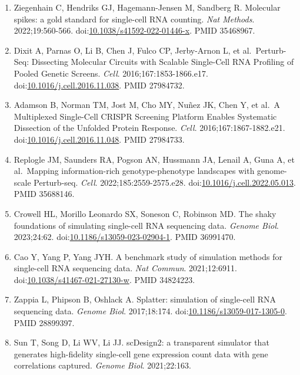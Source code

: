 \documentclass{article}
\begin{document}
\begin{enumerate}
  \emph{Nat Methods}. 2017;14:381-387.
  doi:\href{https://doi.org/10.1038/nmeth.4220}{10.1038/nmeth.4220}.
  PMID 28263961.
\item
  Ziegenhain C, Hendriks GJ, Hagemann-Jensen M, Sandberg R. Molecular
  spikes: a gold standard for single-cell RNA counting. \emph{Nat
  Methods}. 2022;19:560-566.
  doi:\href{https://doi.org/10.1038/s41592-022-01446-x}{10.1038/s41592-022-01446-x}.
  PMID 35468967.
\item
  Dixit A, Parnas O, Li B, Chen J, Fulco CP, Jerby-Arnon L, et
  al.~Perturb-Seq: Dissecting Molecular Circuits with Scalable
  Single-Cell RNA Profiling of Pooled Genetic Screens. \emph{Cell}.
  2016;167:1853-1866.e17.
  doi:\href{https://doi.org/10.1016/j.cell.2016.11.038}{10.1016/j.cell.2016.11.038}.
  PMID 27984732.
\item
  Adamson B, Norman TM, Jost M, Cho MY, Nuñez JK, Chen Y, et al.~A
  Multiplexed Single-Cell CRISPR Screening Platform Enables Systematic
  Dissection of the Unfolded Protein Response. \emph{Cell}.
  2016;167:1867-1882.e21.
  doi:\href{https://doi.org/10.1016/j.cell.2016.11.048}{10.1016/j.cell.2016.11.048}.
  PMID 27984733.
\item
  Replogle JM, Saunders RA, Pogson AN, Hussmann JA, Lenail A, Guna A, et
  al.~Mapping information-rich genotype-phenotype landscapes with
  genome-scale Perturb-seq. \emph{Cell}. 2022;185:2559-2575.e28.
  doi:\href{https://doi.org/10.1016/j.cell.2022.05.013}{10.1016/j.cell.2022.05.013}.
  PMID 35688146.
\item
  Crowell HL, Morillo Leonardo SX, Soneson C, Robinson MD. The shaky
  foundations of simulating single-cell RNA sequencing data.
  \emph{Genome Biol}. 2023;24:62.
  doi:\href{https://doi.org/10.1186/s13059-023-02904-1}{10.1186/s13059-023-02904-1}.
  PMID 36991470.
\item
  Cao Y, Yang P, Yang JYH. A benchmark study of simulation methods for
  single-cell RNA sequencing data. \emph{Nat Commun}. 2021;12:6911.
  doi:\href{https://doi.org/10.1038/s41467-021-27130-w}{10.1038/s41467-021-27130-w}.
  PMID 34824223.
\item
  Zappia L, Phipson B, Oshlack A. Splatter: simulation of single-cell
  RNA sequencing data. \emph{Genome Biol}. 2017;18:174.
  doi:\href{https://doi.org/10.1186/s13059-017-1305-0}{10.1186/s13059-017-1305-0}.
  PMID 28899397.
\item
  Sun T, Song D, Li WV, Li JJ. scDesign2: a transparent simulator that
  generates high-fidelity single-cell gene expression count data with
  gene correlations captured. \emph{Genome Biol}. 2021;22:163.

\end{enumerate}
\end{document}
